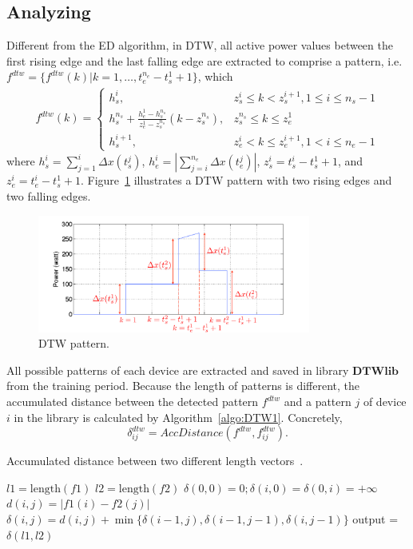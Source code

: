 \subsection{Analyzing}
Different from the ED algorithm, in DTW, all active power values between the first rising edge and the last falling edge are extracted to comprise a pattern, i.e. $f^{dtw}=\{f^{dtw}(k)|k=1,\dots,t_e^{n_e}-t_s^1+1\}$, which
\begin{eqnarray}
f^{dtw}(k)=\begin{cases}
h_s^i, & z_s^i\leq k <z_s^{i+1},1\leq i \leq n_s-1\\
h_s^{n_s}+\frac{h_e^1-h_s^{n_s}}{z_e^1-z_s^{n_s}}\left(k-z_s^{n_s} \right), & z_s^{n_s}\leq k \leq z_e^1\\
h_s^{i+1}, & z_e^i < k \leq z_e^{i+1},1< i\leq n_e-1
\end{cases}
\end{eqnarray}
where $h_s^i = \sum_{j=1}^i{\Delta x(t_s^j)}$, $h_e^i=\left|\sum_{j=i}^{n_e}{\Delta x(t_e^j)}\right|$, $z_s^i=t_s^i-t_s^1+1$, and $z_e^i=t_e^i-t_s^1+1$.
Figure~\ref{fig:dtw2} illustrates a DTW pattern with two rising edges and two falling edges.
\begin{figure}[!h]
\centering
\centerline{\includegraphics[width=0.8\textwidth]{./chapters/chapter4/images/dtwpattern.pdf}}
\caption{DTW pattern.}
\label{fig:dtw2}
%
\end{figure}
All possible patterns of each device are extracted and saved in library $\mathbf{DTWlib}$ from the training period. Because the length of patterns is different, the accumulated distance between the detected pattern $f^{dtw}$ and a pattern $j$ of device $i$ in the library is calculated by Algorithm~\ref{algo:DTW1}. Concretely,
\begin{equation}\label{eqDTW1}
\delta_{ij}^{dtw} = AccDistance(f^{dtw},f_{ij}^{dtw}).
\end{equation}
\begin{algorithm}
\caption{Accumulated distance between two different length vectors~\cite{Liao14}.} \label{algo:DTW1}
\begin{algorithmic}[1]
\State $l1 = \text{length}(f1)$
\State $l2 = \text{length}(f2)$
\State $\delta(0,0) = 0;\delta(i,0) = \delta(0,i) = +\infty$
		    \State $d(i,j) = |f1(i)-f2(j)|$
		    \State $\delta(i,j) = d(i,j)+\min{\{\delta(i-1,j),\delta(i-1,j-1),\delta(i,j-1)\}}$
		 \EndFor
	\EndFor
\State output = $\delta(l1,l2)$
\EndFunction
\end{algorithmic}
\end{algorithm}

